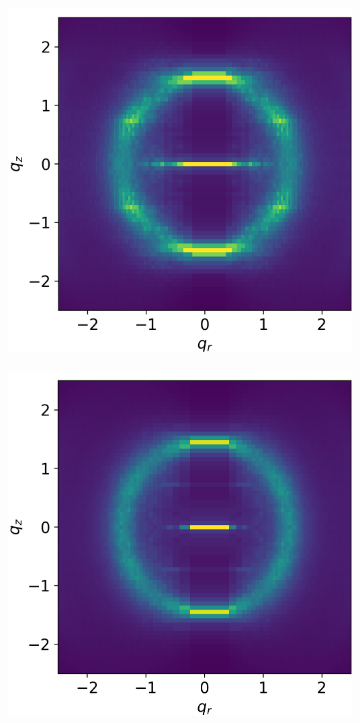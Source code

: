 \documentclass{article}
\begin{document}
  \begin{figure}[H]
	\centering
	\begin{subfigure}{0.31\textwidth}
		\centering
		\hspace{-0.9cm}
		\includegraphics[width=\textwidth]{sandwich_rzplot.png}
		\caption{}\label{fig:sandwich_rzplot}
	\end{subfigure}
	\begin{subfigure}{0.31\textwidth}
		\centering
		\hspace{-0.9cm}
		\includegraphics[width=\textwidth]{offset_rzplot.png}

\end{subfigure}
\end{figure}
\end{document}
